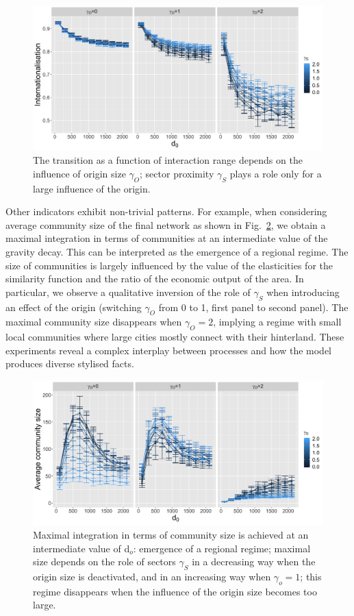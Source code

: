 \documentclass[10pt,letterpaper]{article}
\begin{document}
\begin{figure}
    \includegraphics[width=\linewidth]{figures/Fig5.png}
    \caption{The transition as a function of interaction range depends on the influence of origin size $\gamma_O$; sector proximity $\gamma_S$ plays a role only for a large influence of the origin.\label{fig:fig5}}
\end{figure}


Other indicators exhibit non-trivial patterns. For example, when considering average community size of the final network as shown in Fig.~\ref{fig:fig6}, we obtain a maximal integration in terms of communities at an intermediate value of the gravity decay. This can be interpreted as the emergence of a regional regime. The size of communities is largely influenced by the value of the elasticities for the similarity function and the ratio of the economic output of the area. In particular, we observe a qualitative inversion of the role of $\gamma_S$ when introducing an effect of the origin (switching $\gamma_O$ from 0 to 1, first panel to second panel). The maximal community size disappears when $\gamma_O = 2$, implying a regime with small local communities where large cities mostly connect with their hinterland. These experiments reveal a complex interplay between processes and how the model produces diverse stylised facts.

\begin{figure}
    \includegraphics[width=\textwidth]{figures/Fig6.png}
	\caption{Maximal integration in terms of community size is achieved at an intermediate value of d$_o$: emergence of a regional regime; maximal size depends on the role of sectors $\gamma_S$ in a decreasing way when the origin size is deactivated, and in an increasing way when $\gamma_o=1$; this regime disappears when the influence of the origin size becomes too large.\label{fig:fig6}}
\end{figure}
\end{document}
